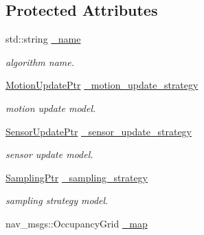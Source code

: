 \subsection*{Protected Attributes}
\begin{DoxyCompactItemize}
\item 
\hypertarget{classPoseFilter_a4cfce1dfd10de209e15ba5788a96ba73}{std\-::string \hyperlink{classPoseFilter_a4cfce1dfd10de209e15ba5788a96ba73}{\-\_\-name}}\label{classPoseFilter_a4cfce1dfd10de209e15ba5788a96ba73}

\begin{DoxyCompactList}\small\item\em algorithm name. \end{DoxyCompactList}\item 
\hypertarget{classPoseFilter_a67e475eebbfbde4da3e357c698b29ebb}{\hyperlink{motion__update_8h_aec1cf0d54c70c4dacac639ab488bf948}{Motion\-Update\-Ptr} \hyperlink{classPoseFilter_a67e475eebbfbde4da3e357c698b29ebb}{\-\_\-motion\-\_\-update\-\_\-strategy}}\label{classPoseFilter_a67e475eebbfbde4da3e357c698b29ebb}

\begin{DoxyCompactList}\small\item\em motion update model. \end{DoxyCompactList}\item 
\hypertarget{classPoseFilter_aa2a032edfb970eb65323febc69f1d722}{\hyperlink{sensor__update_8h_a7bfe6ec1a05f2f99b0974d5cbd8b8b7b}{Sensor\-Update\-Ptr} \hyperlink{classPoseFilter_aa2a032edfb970eb65323febc69f1d722}{\-\_\-sensor\-\_\-update\-\_\-strategy}}\label{classPoseFilter_aa2a032edfb970eb65323febc69f1d722}

\begin{DoxyCompactList}\small\item\em sensor update model. \end{DoxyCompactList}\item 
\hypertarget{classPoseFilter_a7abb5e0250adde708d72937b982d87db}{\hyperlink{sampling_8h_adf4afed667a21b30f8ff816aae609bf7}{Sampling\-Ptr} \hyperlink{classPoseFilter_a7abb5e0250adde708d72937b982d87db}{\-\_\-sampling\-\_\-strategy}}\label{classPoseFilter_a7abb5e0250adde708d72937b982d87db}

\begin{DoxyCompactList}\small\item\em sampling strategy model. \end{DoxyCompactList}\item 
\hypertarget{classPoseFilter_a3412c99421ee59cf13fe0d627b31a400}{nav\-\_\-msgs\-::\-Occupancy\-Grid \hyperlink{classPoseFilter_a3412c99421ee59cf13fe0d627b31a400}{\-\_\-map}}\label{classPoseFilter_a3412c99421ee59cf13fe0d627b31a400}


\end{DoxyCompactItemize}
